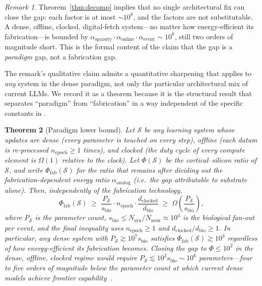 \documentclass[11pt]{article}
\newtheorem{theorem}{Theorem}
\theoremstyle{definition}
\theoremstyle{remark}
\newtheorem{remark}[theorem]{Remark}
\newcommand{\Nsyn}{N_{\mathrm{syn}}}
\newcommand{\Nneur}{N_{\mathrm{neur}}}
\newcommand{\Sys}{\mathcal{S}}
\begin{document}
\begin{remark}
\label{rem:necessity}
Theorem~\ref{thm:decomp} implies that no single architectural fix
can close the gap: each factor is at most $\sim\!10^{8}$, and the
factors are not substitutable.  A dense, offline, clocked,
digital-fetch system---no matter how energy-efficient its
fabrication---is bounded by $\alpha_{\mathrm{sparsity}}\cdot
\alpha_{\mathrm{online}}\cdot\alpha_{\mathrm{event}}\sim 10^{8}$,
still two orders of magnitude short.  This is the formal content of
the claim that the gap is a \emph{paradigm} gap, not a fabrication
gap.
\end{remark}

The remark's qualitative claim admits a quantitative sharpening that
applies to \emph{any} system in the dense paradigm, not only the
particular architectural mix of current LLMs.  We record it as a
theorem because it is the structural result that separates
``paradigm'' from ``fabrication'' in a way independent of the
specific constants in .

\begin{theorem}[Paradigm lower bound]
\label{thm:paradigm-lb}
Let $\Sys$ be any learning system whose updates are
\emph{dense} (every parameter is touched on every step),
\emph{offline} (each datum is re-processed $n_{\mathrm{epoch}}\ge 1$
times), and \emph{clocked} (the duty cycle of every compute element
is $\Omega(1)$ relative to the clock).  Let $\Phi(\Sys)$ be the
cortical--silicon ratio of $\Sys$, and write
$\Phi_{\mathrm{fab}}(\Sys)$ for the ratio that remains after
dividing out the fabrication-dependent energy ratio
$\alpha_{\mathrm{analog}}$ (i.e.\ the gap attributable to substrate
alone).  Then, independently of the fabrication technology,
\[
  \Phi_{\mathrm{fab}}(\Sys)\;\ge\;
  \frac{P_{\mathrm{\Sys}}}{s_{\mathrm{bio}}}\cdot
  n_{\mathrm{epoch}}\cdot\frac{d_{\mathrm{clocked}}}{d_{\mathrm{bio}}}
  \;\ge\;\Omega\!\left(\frac{P_{\mathrm{\Sys}}}{s_{\mathrm{bio}}}\right),
\]
where $P_{\mathrm{\Sys}}$ is the parameter count, $s_{\mathrm{bio}}\le
\Nsyn/\Nneur\approx 10^{4}$ is the biological fan-out per event, and
the final inequality uses $n_{\mathrm{epoch}}\ge 1$ and
$d_{\mathrm{clocked}}/d_{\mathrm{bio}}\ge 1$.  In particular, any
dense system with $P_{\mathrm{\Sys}}\gtrsim 10^{7}s_{\mathrm{bio}}$
satisfies $\Phi_{\mathrm{fab}}(\Sys)\gtrsim 10^{3}$ \emph{regardless
of how energy-efficient its fabrication becomes}.  Closing the gap to
$\Phi\le 10^{2}$ in the dense, offline, clocked regime would require
$P_{\mathrm{\Sys}}\lesssim 10^{2}s_{\mathrm{bio}}\sim 10^{6}$
parameters---four to five orders of magnitude below the
parameter count at which current dense models achieve frontier
capability~\cite{kaplan2020scaling,hoffmann2022chinchilla}.
\end{theorem}
\end{document}
